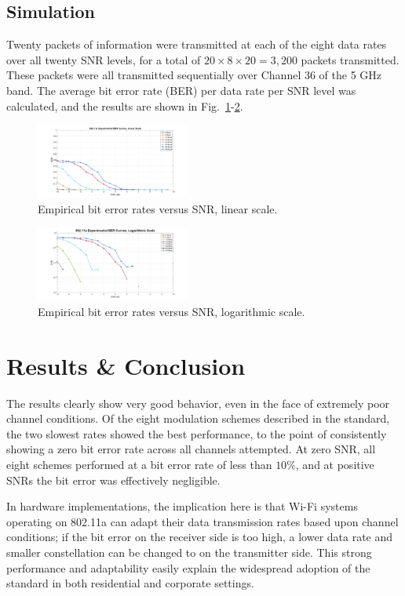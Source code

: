 \documentclass[journal]{IEEEtran}
\begin{document}
\subsection{Simulation}
Twenty packets of information were transmitted at each of the eight data rates over all twenty SNR levels, for a total of $20\times8\times20 = 3,200$ packets transmitted. These packets were all transmitted sequentially over Channel 36 of the 5 GHz band. The average bit error rate (BER) per data rate per SNR level was calculated, and the results are shown in Fig.~\ref{fig:results_linear}-\ref{fig:results_log}.

\begin{figure}
    \centering
    \includegraphics[width = 0.45\textwidth]{LinearScale}
    \caption{Empirical bit error rates versus SNR, linear scale.}
    \label{fig:results_linear}
\end{figure}
\begin{figure}
    \centering
    \includegraphics[width = 0.45\textwidth]{LogScale}
    \caption{Empirical bit error rates versus SNR, logarithmic scale.}
    \label{fig:results_log}
\end{figure}

\section{Results \& Conclusion}
The results clearly show very good behavior, even in the face of extremely poor channel conditions. Of the eight modulation schemes described in the standard, the two slowest rates showed the best performance, to the point of consistently showing a zero bit error rate across all channels attempted. At zero SNR, all eight schemes performed at a bit error rate of less than $10\%$, and at positive SNRs the bit error was effectively negligible. 

In hardware implementations, the implication here is that Wi-Fi systems operating on 802.11a can adapt their data transmission rates based upon channel conditions; if the bit error on the receiver side is too high, a lower data rate and smaller constellation can be changed to on the transmitter side. This strong performance and adaptability easily explain the widespread adoption of the standard in both residential and corporate settings.
\end{document}
